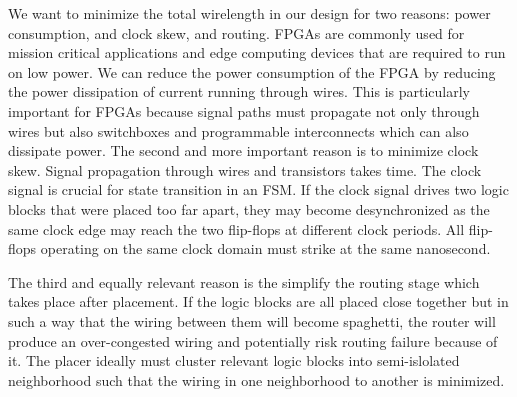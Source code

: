\documentclass{article}
\begin{document}
    We want to minimize the total wirelength in our design for two reasons: power consumption, and clock skew, and routing.
    FPGAs are commonly used for mission critical applications and edge computing devices that are required to run on low power.
    We can reduce the power consumption of the FPGA by reducing the power dissipation of current running through wires.
    This is particularly important for FPGAs because signal paths must propagate not only through wires but also switchboxes and programmable interconnects which can also dissipate power.
    The second and more important reason is to minimize clock skew. 
    Signal propagation through wires and transistors takes time. 
    The clock signal is crucial for state transition in an FSM.
    If the clock signal drives two logic blocks that were placed too far apart, they may become desynchronized as the same clock edge may reach the two flip-flops at different clock periods.
    All flip-flops operating on the same clock domain must strike at the same nanosecond.

    The third and equally relevant reason is the simplify the routing stage which takes place after placement.
    If the logic blocks are all placed close together but in such a way that the wiring between them will become spaghetti, the router will produce an over-congested wiring and potentially risk routing failure because of it. 
    The placer ideally must cluster relevant logic blocks into semi-islolated neighborhood such that the wiring in one neighborhood to another is minimized.
\end{document}
